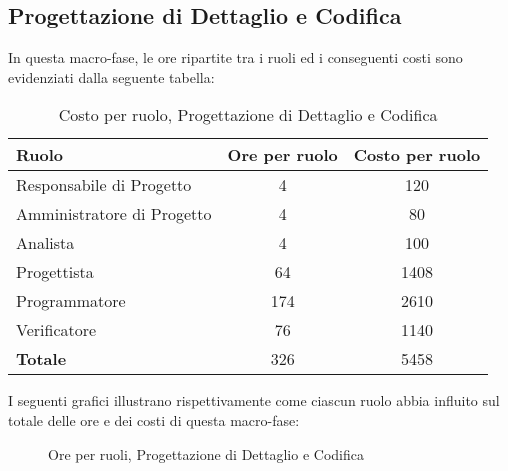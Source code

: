 \subsection{Progettazione di Dettaglio e Codifica}
In questa macro-fase, le ore ripartite tra i ruoli ed i conseguenti costi sono evidenziati dalla seguente tabella:

\begin{table}[h]
\centering
\begin{tabular}{|l|c|c|}
	\toprule
	\textbf{Ruolo} & \textbf{Ore per ruolo} & \textbf{Costo per ruolo} \\
		
	\midrule
	Responsabile di Progetto & 4 & 120 \\
	Amministratore di Progetto & 4 & 80 \\ 
	Analista & 4 & 100 \\
	Progettista & 64 & 1408 \\
	Programmatore & 174 & 2610 \\
	Verificatore & 76 & 1140 \\
	\midrule
	\textbf{Totale} & 326 & 5458 \\
	
	\bottomrule
\end{tabular}
\caption{Costo per ruolo, Progettazione di Dettaglio e Codifica}
\end{table}

\newpage
\noindent I seguenti grafici illustrano rispettivamente come ciascun ruolo abbia influito sul totale delle ore e dei costi di questa macro-fase:
\def\cyclelist{{"yellow","magenta","orange","green","blue","red"}}
\begin{figure}[h]
\centering
{}
\caption{Ore per ruoli, Progettazione di Dettaglio e Codifica}
\end{figure}

